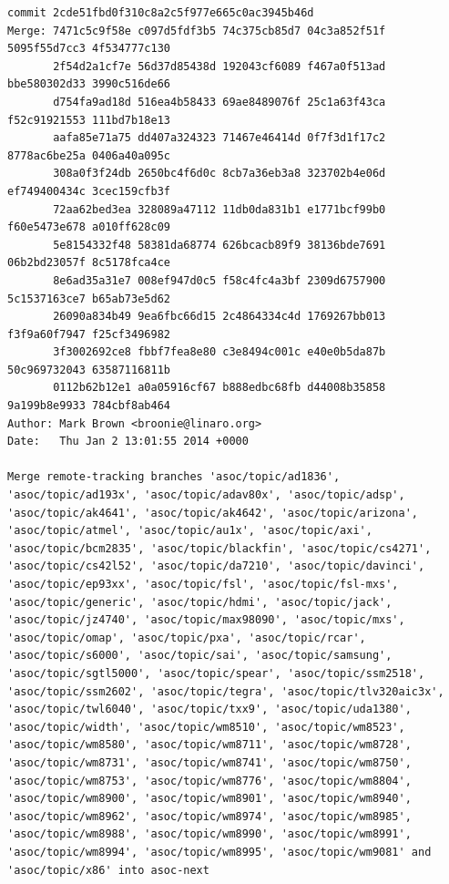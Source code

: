 \documentclass[aspectratio=169,handout]{beamer}
\begin{document}
\begin{frame}[fragile]
	\tiny\begin{lstlisting}[breakatwhitespace=true,prebreak={}]
commit 2cde51fbd0f310c8a2c5f977e665c0ac3945b46d
Merge: 7471c5c9f58e c097d5fdf3b5 74c375cb85d7 04c3a852f51f 5095f55d7cc3 4f534777c130
       2f54d2a1cf7e 56d37d85438d 192043cf6089 f467a0f513ad bbe580302d33 3990c516de66
       d754fa9ad18d 516ea4b58433 69ae8489076f 25c1a63f43ca f52c91921553 111bd7b18e13
       aafa85e71a75 dd407a324323 71467e46414d 0f7f3d1f17c2 8778ac6be25a 0406a40a095c
       308a0f3f24db 2650bc4f6d0c 8cb7a36eb3a8 323702b4e06d ef749400434c 3cec159cfb3f
       72aa62bed3ea 328089a47112 11db0da831b1 e1771bcf99b0 f60e5473e678 a010ff628c09
       5e8154332f48 58381da68774 626bcacb89f9 38136bde7691 06b2bd23057f 8c5178fca4ce
       8e6ad35a31e7 008ef947d0c5 f58c4fc4a3bf 2309d6757900 5c1537163ce7 b65ab73e5d62
       26090a834b49 9ea6fbc66d15 2c4864334c4d 1769267bb013 f3f9a60f7947 f25cf3496982
       3f3002692ce8 fbbf7fea8e80 c3e8494c001c e40e0b5da87b 50c969732043 63587116811b
       0112b62b12e1 a0a05916cf67 b888edbc68fb d44008b35858 9a199b8e9933 784cbf8ab464
Author: Mark Brown <broonie@linaro.org>
Date:   Thu Jan 2 13:01:55 2014 +0000

Merge remote-tracking branches 'asoc/topic/ad1836', 'asoc/topic/ad193x', 'asoc/topic/adav80x', 'asoc/topic/adsp', 'asoc/topic/ak4641', 'asoc/topic/ak4642', 'asoc/topic/arizona', 'asoc/topic/atmel', 'asoc/topic/au1x', 'asoc/topic/axi', 'asoc/topic/bcm2835', 'asoc/topic/blackfin', 'asoc/topic/cs4271', 'asoc/topic/cs42l52', 'asoc/topic/da7210', 'asoc/topic/davinci', 'asoc/topic/ep93xx', 'asoc/topic/fsl', 'asoc/topic/fsl-mxs', 'asoc/topic/generic', 'asoc/topic/hdmi', 'asoc/topic/jack', 'asoc/topic/jz4740', 'asoc/topic/max98090', 'asoc/topic/mxs', 'asoc/topic/omap', 'asoc/topic/pxa', 'asoc/topic/rcar', 'asoc/topic/s6000', 'asoc/topic/sai', 'asoc/topic/samsung', 'asoc/topic/sgtl5000', 'asoc/topic/spear', 'asoc/topic/ssm2518', 'asoc/topic/ssm2602', 'asoc/topic/tegra', 'asoc/topic/tlv320aic3x', 'asoc/topic/twl6040', 'asoc/topic/txx9', 'asoc/topic/uda1380', 'asoc/topic/width', 'asoc/topic/wm8510', 'asoc/topic/wm8523', 'asoc/topic/wm8580', 'asoc/topic/wm8711', 'asoc/topic/wm8728', 'asoc/topic/wm8731', 'asoc/topic/wm8741', 'asoc/topic/wm8750', 'asoc/topic/wm8753', 'asoc/topic/wm8776', 'asoc/topic/wm8804', 'asoc/topic/wm8900', 'asoc/topic/wm8901', 'asoc/topic/wm8940', 'asoc/topic/wm8962', 'asoc/topic/wm8974', 'asoc/topic/wm8985', 'asoc/topic/wm8988', 'asoc/topic/wm8990', 'asoc/topic/wm8991', 'asoc/topic/wm8994', 'asoc/topic/wm8995', 'asoc/topic/wm9081' and 'asoc/topic/x86' into asoc-next
	\end{lstlisting}
\end{frame}
\end{document}

